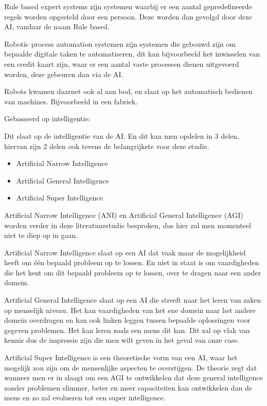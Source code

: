     Rule based expert systems zijn systemen waarbij er een aantal gepredefineerde regels worden opgesteld door een persoon. Deze worden dan gevolgd door deze AI, vandaar de naam Rule based.
    
    Robotic process automation systemen zijn systemen die gebouwd zijn om bepaalde digitale taken te automatiseren, dit kan bijvoorbeeld het inwisselen van een credit kaart zijn, waar er een aantal vaste processen dienen uitgevoerd worden, deze gebeuren dan via de AI.
    
    Robots kwamen daarnet ook al aan bod, en slaat op het automatisch bedienen van machines. Bijvoorbeeld in een fabriek.
    
Gebasseerd op intelligentie:

    Dit slaat op de intelligentie van de AI. En dit kan men opdelen in 3 delen, hiervan zijn 2 delen ook tevens de belangrijkste voor deze studie.
    \begin{itemize}
        \item Artificial Narrow Intelligence
        \item Artificial General Intelligence
        \item Artificial Super Intelligence
    \end{itemize}

    Artificial Narrow Intelligence (ANI) en Artificial General Intelligence (AGI) worden verder in deze literatuurstudie besproken, dus hier zal men momenteel niet te diep op in gaan. 
    
    Artificial Narrow Intelligence slaat op een AI dat vaak maar de mogelijkheid heeft om één bepaald probleem op te lossen. En niet in staat is om vaardigheden die het kent om dit bepaald probleem op te lossen, over te dragen naar een ander domein. 
    
    Artificial General Intelligence slaat op een AI die streeft naar het leren van zaken op menselijk niveau. Het kan vaardigheden van het ene domein naar het andere domein overdragen en kan ook linken leggen tussen bepaalde oplossingen voor gegeven problemen. Het kan leren zoals een mens dit kan. Dit zal op vlak van kennis dus de impressie zijn die men wilt geven in het geval van onze case.
    
    Artificial Super Intelligence is een theoretische vorm van een AI, waar het mogelijk zou zijn om de mensenlijke aspecten te overstijgen. De theorie zegt dat wanneer men er in slaagt om een AGI te ontwikkelen dat deze general intelligence zonder problemen slimmer, beter en meer capaciteiten kan ontwikkelen dan de mens en zo zal evolueren tot een super intelligence. 


